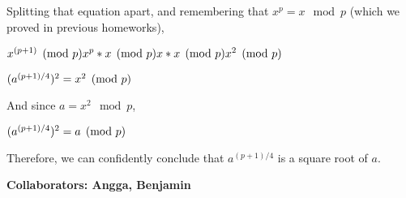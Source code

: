 \documentclass[11pt]{article}
\begin{document}
\begin{enumerate}
{  Splitting that equation apart, and remembering that $x^p = x\mod p$ (which we proved in previous homeworks), 

  $x^{(p+1)} \pmod p \newline
  x^p * x \pmod p \newline
  x * x \pmod p \newline
  x^2 \pmod p \newline
  $

  $(a^{(p+1)/4})^2  = x^2 \pmod p\newline$

  And since $a = x^2\mod p$, \newline

  $(a^{(p+1)/4})^2  = a \pmod p\newline$

  Therefore, we can confidently conclude that $a^{(p+1)/4}$ is a square root of $a$. 
  }



\end{enumerate}
\newpage

{\bfseries Collaborators: Angga, Benjamin} \newline 
\end{document}

